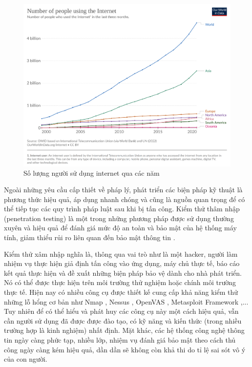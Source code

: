 \begin{figure}
    \centering
    \includegraphics[scale=0.1]{graphics/chapter-1/chap1-number-of-people-use-internet.png}
    \caption{Số lượng người sử dụng internet qua các năm \cite{number2022ourworld}}
    \label{fig:chap1-number-of-people-use-internet}
\end{figure}

Ngoài những yêu cầu cấp thiết về pháp lý, phát triển các biện pháp kỹ thuật là phương thức hiệu quả, áp dụng nhanh chóng và cũng là nguồn quan trọng để có thể  tiếp tục các quy trình pháp luật sau khi bị tấn công. Kiểm thử thâm nhập (penetration testing) là một trong những phương pháp được sử dụng thường xuyên và hiệu quả để đánh giá mức độ an toàn và bảo mật của hệ thống máy tính, giảm thiểu rủi ro liên quan đến bảo mật thông tin \cite{arkin2005software}. 

Kiểm thử xâm nhập nghĩa là, thông qua vai trò như là một hacker, người làm nhiệm vụ thực hiện giả định tấn công vào ứng dụng, máy chủ thực tế, báo cáo kết quả thực hiện và đề xuất những biện pháp bảo vệ dành cho nhà phát triển. Nó có thể được thực hiện trên môi trường thử nghiệm hoặc chính môi trường thực tế. Hiện nay có nhiều công cụ được thiết kế cung cấp khả năng kiểm thử những lỗ hổng cơ bản như Nmap \cite{lyon2009nmap}, Nessus \cite{thacker2006probabilistic}, OpenVAS \cite{aksu2019first}, Metasploit Framework \cite{holik2014effective},... Tuy nhiên để có thể hiểu và phát huy các công cụ này một cách hiệu quả, vẫn cần người sử dụng đã được được đào tạo, có kỹ năng và kiến thức (trong nhiều trường hợp là kinh nghiệm) nhất định. Mặt khác, các hệ thống công nghệ thông tin ngày càng phức tạp, nhiều lớp, nhiệm vụ đánh giá bảo mật theo cách thủ công ngày càng kém hiệu quả, dần dần sẽ không còn khả thi do tỉ lệ sai sót vô ý của con người. 

